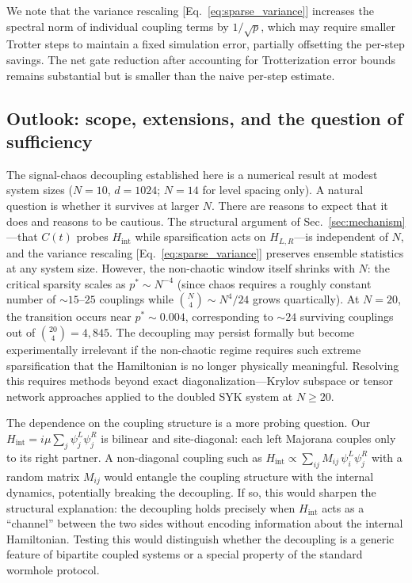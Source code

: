 \documentclass[aps,prd,twocolumn,superscriptaddress,nofootinbib,floatfix]{revtex4-2}
\begin{document}
We note that the variance rescaling [Eq.~\eqref{eq:sparse_variance}]
increases the spectral norm of individual coupling terms by $1/\sqrt{p}$,
which may require smaller Trotter steps to maintain a fixed simulation
error, partially offsetting the per-step savings. The net gate reduction
after accounting for Trotterization error bounds remains substantial but
is smaller than the naive per-step estimate.

\subsection{Outlook: scope, extensions, and the question of sufficiency}
\label{sec:outlook}

The signal-chaos decoupling established here is a numerical result at
modest system sizes ($N=10$, $d = 1024$; $N=14$ for level spacing
only). A natural question is whether it survives at larger $N$. There
are reasons to expect that it does and reasons to be cautious. The
structural argument of Sec.~\ref{sec:mechanism}---that $C(t)$ probes
$H_\mathrm{int}$ while sparsification acts on $H_{L,R}$---is independent
of $N$, and the variance rescaling [Eq.~\eqref{eq:sparse_variance}]
preserves ensemble statistics at any system size. However, the non-chaotic
window itself shrinks with $N$: the critical sparsity scales as
$p^* \sim N^{-4}$ (since chaos requires a roughly constant number of
${\sim}15$--$25$ couplings while $\binom{N}{4} \sim N^4/24$ grows
quartically). At $N=20$, the transition occurs near $p^* \sim 0.004$,
corresponding to ${\sim}24$ surviving couplings out of $\binom{20}{4} =
4{,}845$. The decoupling may persist formally but become experimentally
irrelevant if the non-chaotic regime requires such extreme sparsification
that the Hamiltonian is no longer physically meaningful. Resolving this
requires methods beyond exact diagonalization---Krylov subspace or tensor
network approaches applied to the doubled SYK system at $N \geq 20$.

The dependence on the coupling structure is a more probing question. Our
$H_\mathrm{int} = i\mu\sum_j \psi_j^L \psi_j^R$ is bilinear and
site-diagonal: each left Majorana couples only to its right partner. A
non-diagonal coupling such as $H_\mathrm{int} \propto \sum_{ij}
M_{ij}\,\psi_i^L\psi_j^R$ with a random matrix $M_{ij}$ would entangle
the coupling structure with the internal dynamics, potentially breaking
the decoupling. If so, this would sharpen the structural explanation:
the decoupling holds precisely when $H_\mathrm{int}$ acts as a
``channel'' between the two sides without encoding information about the
internal Hamiltonian. Testing this would distinguish whether the
decoupling is a generic feature of bipartite coupled systems or a special
property of the standard wormhole protocol.
\end{document}
